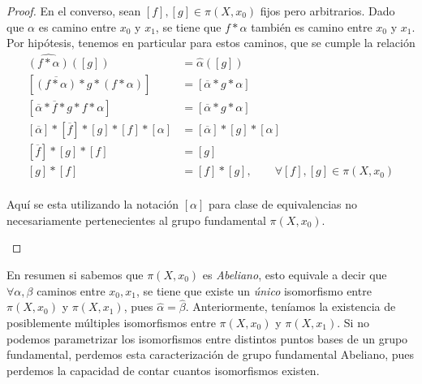 {\begin{proof}
  En el converso, sean \([f],[g] \in \pi (X, x_0) \) fijos pero
  arbitrarios. Dado que \(\alpha\) es camino entre \(x_0\) y \(x_1\), se
  tiene que \(f * \alpha\) también es camino entre \(x_0\) y \(x_1\).
  Por hipótesis, tenemos en particular para estos caminos, que se cumple
  la relación
  \begin{align*}
    \widehat{\left( f * \alpha \right)} ([g]) &= \hat{\alpha} ([g]) \\
    [\overline{(f * \alpha)} * g * (f * \alpha) ] &= [\overline{\alpha}
      * g * \alpha] \\
    [\overline{\alpha} * \overline{f} * g * f * \alpha ] &=
      [\overline{\alpha} * g * \alpha] \\
    [\overline{\alpha}] * [\overline{f}] * [g] * [f] * [\alpha] &=
      [\overline{\alpha}] * [g] * [\alpha] \\
    [\overline{f}] * [g] * [f] &= [g] \\
    [g] * [f] &= [f] * [g], \qquad \forall [f],[g] \in \pi (X, x_0) \\
  \end{align*}

  \begin{acotacion}
    Aquí se esta utilizando la notación \( [\alpha]\) para clase de
    equivalencias no necesariamente pertenecientes al grupo fundamental
    \(\pi (X, x_0)\).
  \end{acotacion}
\end{proof}

En resumen si sabemos que \(\pi (X, x_0)\) es \emph{Abeliano}, esto equivale a
decir que \(\forall \alpha,\beta\) caminos entre \(x_0, x_1\), se tiene
que existe un \emph{único} isomorfismo entre \(\pi (X,x_0) \) y \( \pi
(X,x_1)\), pues \(\hat \alpha = \hat \beta\). Anteriormente, teníamos la
existencia de posiblemente múltiples isomorfismos entre \(\pi (X, x_0)
\) y \(\pi (X, x_1) \). Si no podemos parametrizar los isomorfismos
entre distintos puntos bases de un grupo fundamental, perdemos esta
caracterización de grupo fundamental Abeliano, pues perdemos la capacidad
de contar cuantos isomorfismos existen.

}

